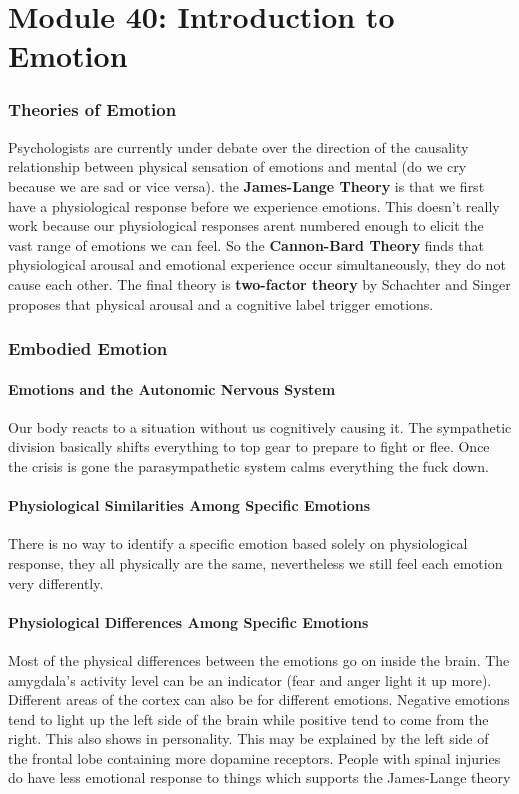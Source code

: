 \documentclass[12pt]{article}
\begin{document}
\part*{Module 40: Introduction to Emotion}
\section*{Theories of Emotion}
Psychologists are currently under debate over the direction of the causality relationship between physical sensation of emotions and mental (do we cry because we are sad or vice versa). the \textbf{James-Lange Theory} is that we first have a physiological response before we experience emotions. This doesn’t really work because our physiological responses arent numbered enough to elicit the vast range of emotions we can feel. So the \textbf{Cannon-Bard Theory} finds that physiological arousal and emotional experience occur simultaneously, they do not cause each other. The final theory is \textbf{two-factor theory} by Schachter and Singer proposes that physical arousal and a cognitive label trigger emotions. 
\section*{Embodied Emotion} 
\subsection*{Emotions and the Autonomic Nervous System}
Our body reacts to a situation without us cognitively causing it. The sympathetic division basically shifts everything to top gear to prepare to fight or flee. Once the crisis is gone the parasympathetic system calms everything the fuck down. 
\subsection*{Physiological Similarities Among Specific Emotions}
There is no way to identify a specific emotion based solely on physiological response, they all physically are the same, nevertheless we still feel each emotion very differently. 
\subsection*{Physiological Differences Among Specific Emotions}
Most of the physical differences between the emotions go on inside the brain. The amygdala's activity level can be an indicator (fear and anger light it up more). Different areas of the cortex can also be for different emotions. Negative emotions tend to light up the left side of the brain while positive tend to come from the right. This also shows in personality. This may be explained by the left side of the frontal lobe containing more dopamine receptors. People with spinal injuries do have less emotional response to things which supports the James-Lange theory
\end{document}
